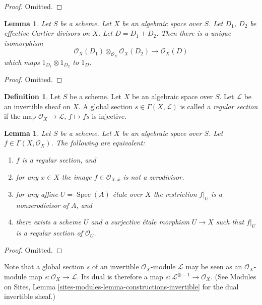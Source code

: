 \documentclass{stacks-project}
\theoremstyle{plain}
\newtheorem{lemma}[subsection]{Lemma}
\theoremstyle{definition}
\newtheorem{definition}[subsection]{Definition}
\theoremstyle{remark}
\numberwithin{equation}{subsection}
\def\Spec{\mathop{\mathrm{Spec}}}
\begin{document}
\begin{proof}
Omitted.
\end{proof}

\begin{lemma}
\label{lemma-invertible-sheaf-sum-effective-Cartier-divisors}
Let $S$ be a scheme. Let $X$ be an algebraic space over $S$.
Let $D_1$, $D_2$ be effective Cartier divisors on $X$.
Let $D = D_1 + D_2$.
Then there is a unique isomorphism
$$
\mathcal{O}_X(D_1) \otimes_{\mathcal{O}_X} \mathcal{O}_X(D_2)
\longrightarrow
\mathcal{O}_X(D)
$$
which maps $1_{D_1} \otimes 1_{D_2}$ to $1_D$.
\end{lemma}

\begin{proof}
Omitted.
\end{proof}

\begin{definition}
\label{definition-regular-section}
Let $S$ be a scheme. Let $X$ be an algebraic space over $S$.
Let $\mathcal{L}$ be an invertible sheaf on $X$.
A global section $s \in \Gamma(X, \mathcal{L})$ is called a
{\it regular section} if the map $\mathcal{O}_X \to \mathcal{L}$,
$f \mapsto fs$ is injective.
\end{definition}

\begin{lemma}
\label{lemma-regular-section-structure-sheaf}
Let $S$ be a scheme.
Let $X$ be an algebraic space over $S$.
Let $f \in \Gamma(X, \mathcal{O}_X)$.
The following are equivalent:
\begin{enumerate}
\item $f$ is a regular section, and
\item for any $x \in X$ the image $f \in \mathcal{O}_{X, \overline{x}}$
is not a zerodivisor.
\item for any affine $U = \Spec(A)$ \'etale over $X$
the restriction $f|_U$ is a nonzerodivisor of $A$, and
\item there exists a scheme $U$ and a surjective \'etale morphism
$U \to X$ such that $f|_U$ is a regular section of $\mathcal{O}_U$.
\end{enumerate}
\end{lemma}

\begin{proof}
Omitted.
\end{proof}

\noindent
Note that a global section $s$ of an invertible $\mathcal{O}_X$-module
$\mathcal{L}$ may be seen as an $\mathcal{O}_X$-module map
$s : \mathcal{O}_X \to \mathcal{L}$. Its dual is therefore a
map $s : \mathcal{L}^{\otimes -1} \to \mathcal{O}_X$.
(See Modules on Sites, Lemma \ref{sites-modules-lemma-constructions-invertible}
for the dual invertible sheaf.)
\end{document}
